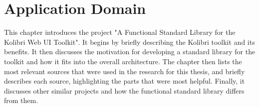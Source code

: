 \chapter{Application Domain}
\label{chap:application_domain}
This chapter introduces the project "A Functional Standard Library for the
Kolibri Web UI Toolkit". It begins by briefly describing the Kolibri toolkit
and its benefits. It then discusses the motivation for developing a standard
library for the toolkit and how it fits into the overall architecture. The
chapter then lists the most relevant sources that were used in the research for
this thesis, and briefly describes each source, highlighting the parts that
were most helpful. Finally, it discusses other similar projects and
how the functional standard library differs from them.



